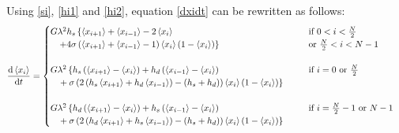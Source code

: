 \documentclass[12pt]{article}
\begin{document}
Using \ref{si}, \ref{hi1} and \ref{hi2}, equation \ref{dxidt} can be rewritten as follows:
\begin{align*}
\frac{\mathrm d\left\langle x_i \right\rangle}{\mathrm dt} &=
 \begin{cases}
G \lambda^2 h_s \left\lbrace \left\langle x_{i+1} \right\rangle + \left\langle x_{i-1} \right\rangle  -  2\left\langle x_i \right\rangle \right.   & \phantom{blah} \text{if $0<i<\frac{N}{2}$}
%
%
 \\ \phantom{bl} \left. + 4\sigma \left( \left\langle x_{i+1} \right\rangle + \left\langle x_{i-1} \right\rangle -1 \right) \left\langle x_i \right\rangle \left(1- \left\langle x_i \right\rangle \right) \right\rbrace & \phantom{blah} \text{or $\frac{N}{2} < i < N-1 $}
 \\ \quad & \quad
 \\ G \lambda^2 \left\lbrace h_s \left( \left\langle x_{i+1} \right\rangle -  \left\langle x_{i} \right\rangle \right)  + h_d \left( \left\langle x_{i-1} \right\rangle -  \left\langle x_{i} \right\rangle \right) \right. & \phantom{blah} \text{if $i = 0$ or $ \frac{N}{2}$} 
 \\ \left. \phantom{bl} + \sigma \left( 2\left( h_s \left\langle x_{i+1} \right\rangle + h_d \left\langle x_{i-1} \right\rangle  \right) - \left(h_s + h_d \right) \right)\left\langle x_i \right\rangle \left(1- \left\langle x_i \right\rangle \right) \right\rbrace & \quad
 \\ \quad & \quad 
\\ G \lambda^2 \left\lbrace h_d \left( \left\langle x_{i+1} \right\rangle -  \left\langle x_{i} \right\rangle \right)  + h_s \left( \left\langle x_{i-1} \right\rangle -  \left\langle x_{i} \right\rangle \right) \right. & \phantom{blah} \text{if $i = \frac{N}{2}-1$ or $ N-1$} 
 \\ \left. \phantom{bl} + \sigma \left( 2\left( h_d \left\langle x_{i+1} \right\rangle + h_s \left\langle x_{i-1} \right\rangle  \right) - \left(h_s + h_d \right) \right) \left\langle x_i \right\rangle \left(1- \left\langle x_i \right\rangle \right) \right\rbrace & \quad
\end{cases}
\end{align*}
\end{document}
